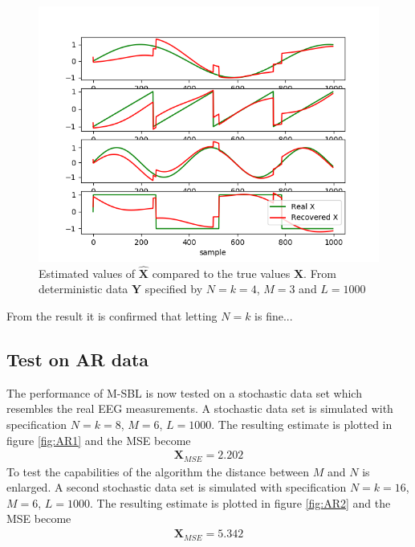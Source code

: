 \begin{figure}[H]
\centering
\includegraphics[scale=0.5]{figures/ch_6/M-SBL_simple3.png}
\caption{Estimated values of $\hat{\textbf{X}}$ compared to the true 				values $\textbf{X}$. From deterministic data $\textbf{Y}$ specified by $N=k=4$, $M = 3$ and $L=1000$ }
\label{fig:M-SBL_simple3}
\end{figure}

From the result it is confirmed that letting $N=k$ is fine... 

\subsection{Test on AR data}
The performance of M-SBL is now tested on a stochastic data set which resembles the real EEG measurements. 
A stochastic data set is simulated with specification $N=k=8$, $M = 6$, $L=1000$. The resulting estimate is plotted in figure \ref{fig:AR1} and the MSE become 
\begin{align*}
\textbf{X}_{MSE} = 2.202 
\end{align*}  
To test the capabilities of the algorithm the distance between $M$ and $N$ is enlarged. A second stochastic data set is simulated with specification $N=k=16$, $M = 6$, $L=1000$. The resulting estimate is plotted in figure \ref{fig:AR2} and the MSE become 
\begin{align*}
\textbf{X}_{MSE} = 5.342 
\end{align*}  

